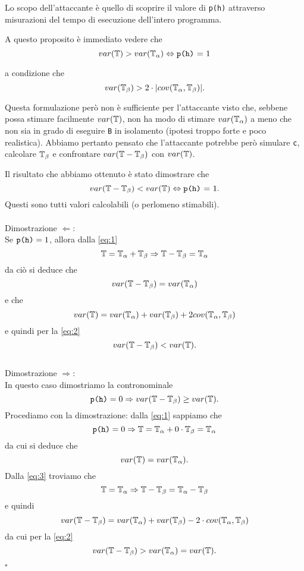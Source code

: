 	Lo scopo dell'attaccante è quello di scoprire il valore di \texttt{p(h)} attraverso misurazioni del tempo di esecuzione dell'intero programma.
	
	A questo proposito è immediato vedere che $$var(\mathbb{T}) > var(\mathbb{T}_{\alpha}) \Leftrightarrow \text{\texttt{p(h)} = 1}$$ 
	
	a condizione che 
	\begin{equation} \label{eq:2}
		var(\mathbb{T}_{\beta}) > 2 \cdot |cov(\mathbb{T}_{\alpha},\mathbb{T}_{\beta})|.
	\end{equation}
		
	Questa formulazione però non è sufficiente per l'attaccante visto che, sebbene possa stimare facilmente $var(\mathbb{T})$, non ha modo di stimare $var(\mathbb{T}_{\alpha})$ a meno che non sia in grado di eseguire \texttt{B} in isolamento (ipotesi troppo forte e poco realistica). Abbiamo pertanto pensato che l'attaccante potrebbe però simulare \texttt{c}, calcolare $\mathbb{T}_{\beta}$ e confrontare $var(\mathbb{T} - \mathbb{T}_{\beta})$ con $var(\mathbb{T})$. 
	
	Il risultato che abbiamo ottenuto è stato dimostrare che $$var(\mathbb{T} - \mathbb{T}_{\beta}) < var(\mathbb{T}) \Leftrightarrow \text{\texttt{p(h)} = 1}.$$ Questi sono tutti valori calcolabili (o perlomeno stimabili).\\ \\Dimostrazione $\Leftarrow$:\\
	Se $\text{\texttt{p(h)}} = 1$, allora dalla \ref{eq:1} $$\mathbb{T} = \mathbb{T}_{\alpha} + \mathbb{T}_{\beta} \Rightarrow \mathbb{T} - \mathbb{T}_{\beta} = \mathbb{T}_{\alpha}$$
	da ciò si deduce che $$var(\mathbb{T} - \mathbb{T}_{\beta}) = var(\mathbb{T}_{\alpha})$$ 
	e che $$var(\mathbb{T}) = var(\mathbb{T}_{\alpha}) + var(\mathbb{T}_{\beta}) + 2cov(\mathbb{T}_{\alpha},\mathbb{T}_{\beta})$$
	e quindi per la \ref{eq:2} $$var(\mathbb{T} - \mathbb{T}_{\beta}) < var(\mathbb{T}).$$\\Dimostrazione $\Rightarrow$:\\
	In questo caso dimostriamo la contronominale $$\text{\texttt{p(h)}} = 0 \Rightarrow var(\mathbb{T} - \mathbb{T}_{\beta}) \geq var(\mathbb{T}).$$  
	Procediamo con la dimostrazione:
	dalla \ref{eq:1} sappiamo che
	\begin{equation} \label{eq:3}
		\text{\texttt{p(h)}} = 0 \Rightarrow \mathbb{T} = \mathbb{T}_{\alpha} + 0\cdot \mathbb{T}_{\beta} = \mathbb{T}_{\alpha}
	\end{equation}
	da cui si deduce che $$var(\mathbb{T}) = var(\mathbb{T}_{\alpha}).$$
	Dalla \ref{eq:3} troviamo che
	$$\mathbb{T} = \mathbb{T}_{\alpha} \Rightarrow \mathbb{T} - \mathbb{T}_{\beta} = \mathbb{T}_{\alpha} - \mathbb{T}_{\beta}$$
	e quindi
	$$var(\mathbb{T} - \mathbb{T}_{\beta}) = var(\mathbb{T}_{\alpha}) + var(\mathbb{T}_{\beta}) - 2\cdot cov (\mathbb{T}_{\alpha},\mathbb{T}_{\beta})$$
	da cui per la \ref{eq:2}
	$$var(\mathbb{T} - \mathbb{T}_{\beta}) > var(\mathbb{T}_{\alpha}) = var(\mathbb{T}).$$
	\begin{flushright}
		$\square$
	\end{flushright}

